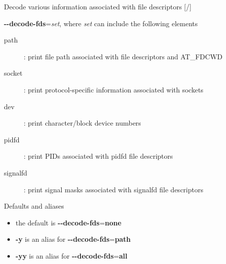 \documentclass[unicode,aspectratio=169,xcolor={table,dvipsnames,usernames}]{beamer}
\begin{document}
\begin{frame}{Decode various information associated with file descriptors \hfill [\insertframenumber/\inserttotalframenumber]}
\large
\begin{block}{\large \textbf{-{}-decode-fds}=\textit{set}, where \textit{set} can include the following elements}
\begin{description}
	\item[path]: print file path associated with file descriptors and AT\_FDCWD
	\item[socket]: print protocol-specific information associated with sockets
	\item[dev]: print character/block device numbers
	\item[pidfd]: print PIDs associated with pidfd file descriptors
	\item[signalfd]: print signal masks associated with signalfd file descriptors
\end{description}
\end{block}
\begin{block}{\large Defaults and aliases}
\begin{itemize}
\item the default is \textbf{-{}-decode-fds}=\textbf{none}
\item \textbf{-y} is an alias for \textbf{-{}-decode-fds}=\textbf{path}
\item \textbf{-yy} is an alias for \textbf{-{}-decode-fds}=\textbf{all}
\end{itemize}
\end{block}
\end{frame}
\end{document}

